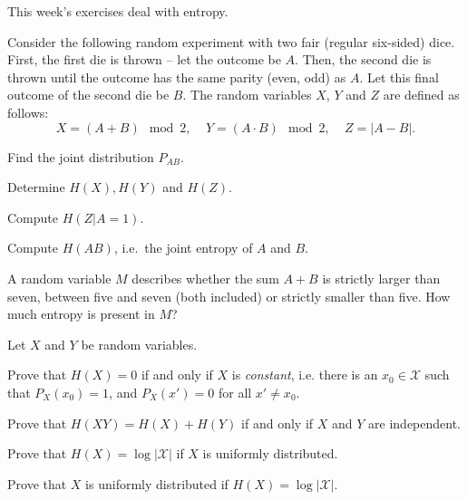\documentclass[a4paper,10pt,landscape,twocolumn]{scrartcl}
\begin{document}
\practiceproblems

{\sffamily\noindent
This week's exercises deal with entropy. \practiceinstructions
}

\setcounter{exCount}{-1}
\begin{exercise}
	Consider the following random experiment with two fair (regular six-sided) dice. First, the first die is thrown -- let the outcome be $A$. Then, the second die is thrown until the outcome has the same parity (even, odd) as $A$. Let this final outcome of the second die be $B$. The random variables $X$, $Y$ and $Z$ are defined as follows:
	\[
	X = (A + B) \mod 2, \ \ \ \ \ Y = (A \cdot B) \mod 2, \ \ \ \ \ Z = |A - B|.
	\]
	\begin{subex}
		Find the joint distribution $P_{AB}$.
	\end{subex}
	\begin{subex}
		Determine $H(X), H(Y)$ and $H(Z)$.
	\end{subex}
	\begin{subex}
		Compute $H(Z|A=1)$.
	\end{subex}
	\begin{subex}
		Compute $H(AB)$, i.e.\ the joint entropy of $A$ and $B$.
	\end{subex}
	\begin{subex}
		A random variable $M$ describes whether the sum $A + B$ is strictly larger than seven, between five and seven (both included) or strictly smaller than five. How much entropy is present in $M$?
	\end{subex}
\end{exercise}

\begin{exercise}
Let $X$ and $Y$ be random variables.
	\begin{subex}
	Prove that $H(X) = 0$ if and only if $X$ is \emph{constant}, i.e. there is an $x_0 \in \mathcal{X}$ such that $P_X(x_0) = 1$, and $P_X(x') = 0$ for all $x' \neq x_0$.
	\end{subex}
	
	\begin{subex}
	Prove that $H(XY) = H(X) + H(Y)$ if and only if $X$ and $Y$ are independent.
	\end{subex}

	\begin{subex}
	Prove that $H(X) = \log |\mathcal{X}|$ if $X$ is uniformly distributed.
	\end{subex}

	\begin{subex**}
	Prove that $X$ is uniformly distributed if $H(X) = \log |\mathcal{X}|$.
	\end{subex**}
	
\end{exercise}
\end{document}
